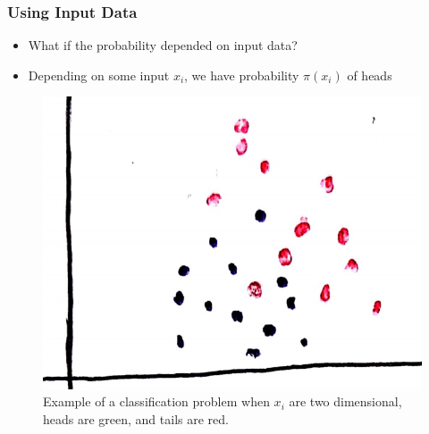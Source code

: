 \documentclass[10pt,mathserif]{beamer}
\begin{document}
\begin{frame}
  \frametitle{Using Input Data}
  \begin{itemize}
  \item What if the probability depended on input data?
  \item Depending on some input $x_i$, we have probability $\pi\left(x_i\right)$
    of heads
  \end{itemize}
  \begin{figure}
    \centering
    \includegraphics[width=0.3\paperwidth]{figure/logistic_scatter}
    \caption{Example of a classification problem when $x_i$ are two dimensional,
      heads are green, and tails are red. \label{fig:logistic_scatter} }
  \end{figure}
\end{frame}
\end{document}
